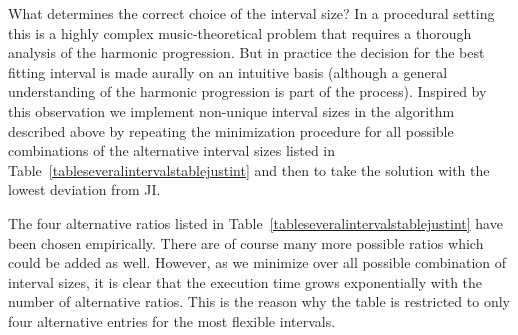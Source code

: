 What determines the correct choice of the interval size? In a procedural setting this is a highly complex music-theoretical problem that requires a thorough analysis of the harmonic progression. But in practice the decision for the best fitting interval is made aurally on an intuitive basis (although a general understanding of the harmonic progression is part of the process). Inspired by this observation we implement non-unique interval sizes in the algorithm described above by repeating the minimization procedure for all possible combinations of the alternative interval sizes listed in Table~\ref{tableseveralintervalstablejustint} and then to take the solution with the lowest deviation from JI. 

The four alternative ratios listed in Table~\ref{tableseveralintervalstablejustint} have been chosen empirically. There are of course many more possible ratios which could be added as well. However, as we minimize over all possible combination of interval sizes, it is clear that the execution time grows exponentially with the number of alternative ratios. This is the reason why the table is restricted to only four alternative entries for the most flexible intervals.